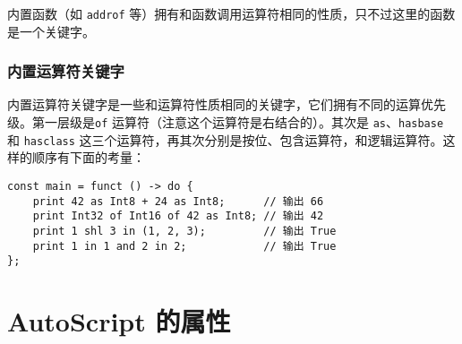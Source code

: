 内置函数（如 \lstinline!addrof! 等）拥有和函数调用运算符相同的性质，只不过这里的函数是一个关键字。

\subsection{内置运算符关键字}

内置运算符关键字是一些和运算符性质相同的关键字，它们拥有不同的运算优先级。第一层级是\lstinline!of! 运算符（注意这个运算符是右结合的）。其次是 \lstinline!as!、\lstinline!hasbase! 和 \lstinline!hasclass! 这三个运算符，再其次分别是按位、包含运算符，和逻辑运算符。这样的顺序有下面的考量：

\begin{lstlisting}
const main = funct () -> do {
    print 42 as Int8 + 24 as Int8;      // 输出 66
    print Int32 of Int16 of 42 as Int8; // 输出 42
    print 1 shl 3 in (1, 2, 3);         // 输出 True
    print 1 in 1 and 2 in 2;            // 输出 True
};
\end{lstlisting}




\chapter{AutoScript 的属性}

